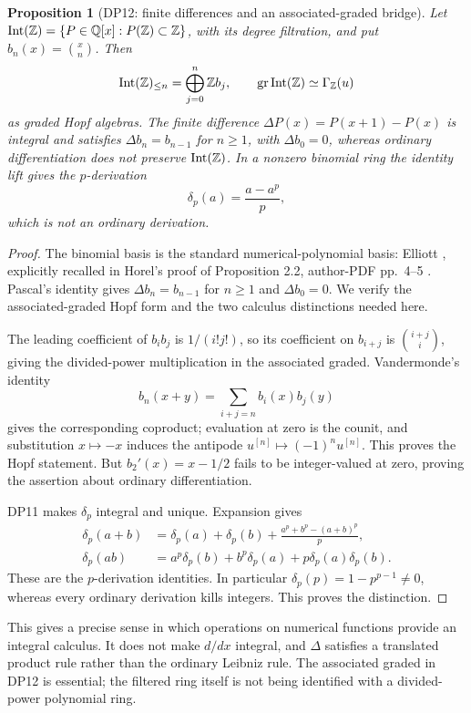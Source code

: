 \documentclass[11pt,a4paper]{article}
\newtheorem{proposition}[theorem]{Proposition}
\theoremstyle{definition}\newtheorem{remark}[theorem]{Remark}
\newcommand{\Z}{\mathbb Z}\newcommand{\Q}{\mathbb Q}\newcommand{\F}{\mathbb F}
\begin{document}
\begin{proposition}[DP12: finite differences and an associated-graded bridge]\label{DP12}
Let $\Int(\Z)=\{P\in\Q[x]:P(\Z)\subset\Z\}$, with its degree filtration, and put $b_n(x)=\binom xn$. Then
\[
 \Int(\Z)_{\le n}=\bigoplus_{j=0}^n\Z b_j,
 \qquad\gr\Int(\Z)\simeq\Gamma_\Z(u)
\]
as graded Hopf algebras. The finite difference $\Delta P(x)=P(x+1)-P(x)$ is integral and satisfies $\Delta b_n=b_{n-1}$ for $n\ge1$, with $\Delta b_0=0$, whereas ordinary differentiation does not preserve $\Int(\Z)$. In a nonzero binomial ring the identity lift gives the $p$-derivation
\[
 \delta_p(a)=\frac{a-a^p}{p},
\]
which is not an ordinary derivation.
\end{proposition}
\begin{proof}
The binomial basis is the standard numerical-polynomial basis: Elliott \cite[Lemma 2.2]{Elliott}, explicitly recalled in Horel's proof of Proposition 2.2, author-PDF pp.~4--5 \cite{Horel}. Pascal's identity gives $\Delta b_n=b_{n-1}$ for $n\ge1$ and $\Delta b_0=0$. We verify the associated-graded Hopf form and the two calculus distinctions needed here.

The leading coefficient of $b_ib_j$ is $1/(i!j!)$, so its coefficient on $b_{i+j}$ is $\binom{i+j}i$, giving the divided-power multiplication in the associated graded. Vandermonde's identity
\[
 b_n(x+y)=\sum_{i+j=n}b_i(x)b_j(y)
\]
gives the corresponding coproduct; evaluation at zero is the counit, and substitution $x\mapsto-x$ induces the antipode $u^{[n]}\mapsto(-1)^nu^{[n]}$. This proves the Hopf statement. But $b_2'(x)=x-1/2$ fails to be integer-valued at zero, proving the assertion about ordinary differentiation.

DP11 makes $\delta_p$ integral and unique. Expansion gives
\begin{align*}
 \delta_p(a+b)&=\delta_p(a)+\delta_p(b)+\frac{a^p+b^p-(a+b)^p}{p},\\
 \delta_p(ab)&=a^p\delta_p(b)+b^p\delta_p(a)+p\delta_p(a)\delta_p(b).
\end{align*}
These are the $p$-derivation identities. In particular $\delta_p(p)=1-p^{p-1}\ne0$, whereas every ordinary derivation kills integers. This proves the distinction.
\end{proof}

This gives a precise sense in which operations on numerical functions provide an integral calculus. It does not make $d/dx$ integral, and $\Delta$ satisfies a translated product rule rather than the ordinary Leibniz rule. The associated graded in DP12 is essential; the filtered ring itself is not being identified with a divided-power polynomial ring.
\end{document}

